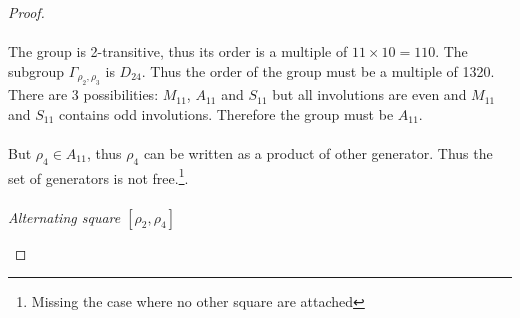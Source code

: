 \begin{proof}
\paragraph{}
The group is 2-transitive, thus its order is a multiple of $11 \times 10 = 110$. The subgroup $\Gamma_{\rho_2, \rho_3}$ is $D_24$. Thus the order of the group must be a multiple of 1320. There are 3 possibilities: $M_{11}$, $A_{11}$ and $S_{11}$ but all involutions are even and $M_{11}$ and $S_{11}$ contains odd involutions. Therefore the group must be $A_{11}$.

\paragraph{}
But $\rho_4 \in A_{11}$, thus $\rho_4$ can be written as a product of other generator. Thus the set of generators is not free.\footnote{Missing the case where no other square are attached}.

\paragraph{}
\textit{Alternating square $[\rho_2,\rho_4]$}

\begin{figure}[H]
  \begin{center}
\end{center}
\end{figure}
\end{proof}
